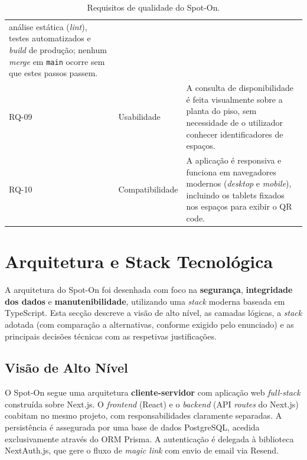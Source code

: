 \documentclass[11pt,a4paper]{article}
\begin{document}
\begin{table}[h!]
\begin{tabularx}{\linewidth}{@{}llX@{}}
        análise estática (\emph{lint}), testes automatizados e \emph{build} de
        produção; nenhum \emph{merge} em \texttt{main} ocorre sem que estes passos
        passem.                                                              \\
        RQ-09       & Usabilidade        &
        A consulta de disponibilidade é feita visualmente sobre a planta do piso,
        sem necessidade de o utilizador conhecer identificadores de espaços. \\
        RQ-10       & Compatibilidade    &
        A aplicação é responsiva e funciona em navegadores modernos (\emph{desktop} e
        \emph{mobile}), incluindo os tablets fixados nos espaços para exibir o QR
        code.                                                                \\
        \bottomrule
    \end{tabularx}
    \caption{Requisitos de qualidade do Spot-On.}
\end{table}

\section{Arquitetura e Stack Tecnológica}\label{sec:arch}

A arquitetura do Spot-On foi desenhada com foco na \textbf{segurança},
\textbf{integridade dos dados} e \textbf{manutenibilidade}, utilizando uma
\emph{stack} moderna baseada em TypeScript. Esta secção descreve a visão de
alto nível, as camadas lógicas, a \emph{stack} adotada (com comparação a
alternativas, conforme exigido pelo enunciado) e as principais decisões
técnicas com as respetivas justificações.

\subsection{Visão de Alto Nível}

O Spot-On segue uma arquitetura \textbf{cliente-servidor} com aplicação web
\emph{full-stack} construída sobre Next.js. O \emph{frontend} (React) e o
\emph{backend} (API \emph{routes} do Next.js) coabitam no mesmo projeto, com
responsabilidades claramente separadas. A persistência é assegurada por uma
base de dados PostgreSQL, acedida exclusivamente através do ORM Prisma. A
autenticação é delegada à biblioteca NextAuth.js, que gere o fluxo de
\emph{magic link} com envio de email via Resend.
\end{document}
